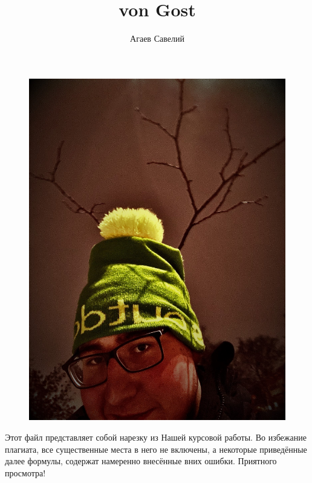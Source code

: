 \documentclass[a4paper, 14pt]{scrarticle}
\theoremstyle{Imperial}
\begin{document}
	\title{von Gost}
	\author{Агаев Савелий}
	\maketitle
	\thispagestyle{empty}	
	\begin{figure}[p]
		\hfill\includegraphics[scale=0.25]{GeSavah.JPEG}\hspace*{\fill}
	\end{figure}
	\newpage
	
	Этот файл представляет собой нарезку из Нашей курсовой работы. Во избежание плагиата, все существенные места в него не включены, а некоторые приведённые далее формулы, содержат намеренно внесённые вних ошибки. Приятного просмотра!
	
\end{document}
